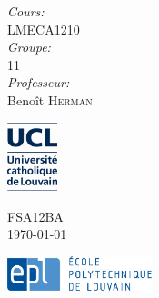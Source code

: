 \documentclass{article}
\begin{document}
\begin{titlepage}
\begin{center}
\begin{minipage}{0.4\textwidth}
\begin{flushleft}
\begin{tabular}{l l l}
\end{tabular}
\end{flushleft}
\end{minipage}
\begin{minipage}{0.4\textwidth}
\begin{flushright} \large
\emph{Cours:} \\
LMECA1210\\
\emph{Groupe:} \\
11\\
\emph{Professeur:} \\
Benoît \textsc{Herman}
\end{flushright}
\end{minipage}
\vspace{3cm}

\begin{minipage}{0.3\textwidth}
\begin{flushleft}
\includegraphics[height=2cm]{Schema/logo_UCL_NEW_janv2013.JPG}
\end{flushleft}
\end{minipage}
\begin{minipage}{0.3\textwidth}
\begin{center}
{\large FSA12BA}\\
{\large \today}
\end{center}
\end{minipage}
\begin{minipage}{0.3\textwidth}
\begin{flushright}
\includegraphics[height=1cm]{Schema/epl-logo.jpg}
\end{flushright}
\end{minipage}
\end{center}
\end{titlepage}
\end{document}
